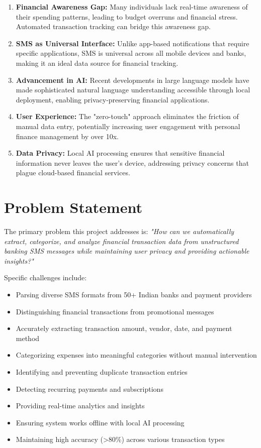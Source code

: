 \documentclass[11pt,a4paper]{report}
\begin{document}
\begin{enumerate}
    \item \textbf{Financial Awareness Gap:} Many individuals lack real-time awareness of their spending patterns, leading to budget overruns and financial stress. Automated transaction tracking can bridge this awareness gap.
    
    \item \textbf{SMS as Universal Interface:} Unlike app-based notifications that require specific applications, SMS is universal across all mobile devices and banks, making it an ideal data source for financial tracking.
    
    \item \textbf{Advancement in AI:} Recent developments in large language models have made sophisticated natural language understanding accessible through local deployment, enabling privacy-preserving financial applications.
    
    \item \textbf{User Experience:} The "zero-touch" approach eliminates the friction of manual data entry, potentially increasing user engagement with personal finance management by over 10x.
    
    \item \textbf{Data Privacy:} Local AI processing ensures that sensitive financial information never leaves the user's device, addressing privacy concerns that plague cloud-based financial services.
\end{enumerate}

\section{Problem Statement}

The primary problem this project addresses is: \textit{"How can we automatically extract, categorize, and analyze financial transaction data from unstructured banking SMS messages while maintaining user privacy and providing actionable insights?"}

Specific challenges include:

\begin{itemize}
    \item Parsing diverse SMS formats from 50+ Indian banks and payment providers
    \item Distinguishing financial transactions from promotional messages
    \item Accurately extracting transaction amount, vendor, date, and payment method
    \item Categorizing expenses into meaningful categories without manual intervention
    \item Identifying and preventing duplicate transaction entries
    \item Detecting recurring payments and subscriptions
    \item Providing real-time analytics and insights
    \item Ensuring system works offline with local AI processing
    \item Maintaining high accuracy (>80\%) across various transaction types
\end{itemize}
\end{document}
